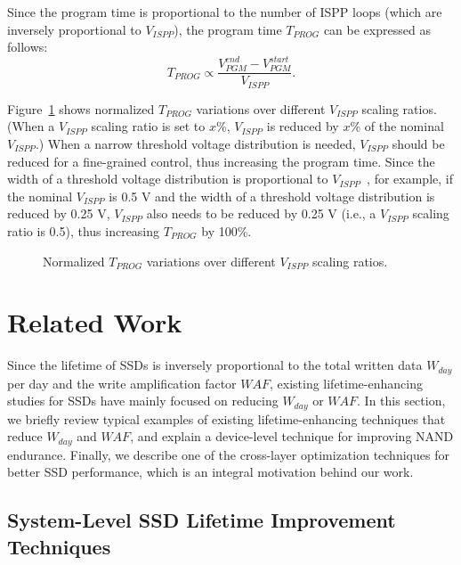 Since the program time is proportional to the number of ISPP loops (which are inversely proportional to $V_{ISPP}$), the program time $T_{PROG}$ can be expressed as follows:
\begin{equation}\label{eq:Background_Tpgm}
T_{PROG} \propto \frac{V_{PGM}^{end} - V_{PGM}^{start}}{V_{ISPP}}.
\end{equation}


Figure~\ref{fig:Background_TprogVispp} shows normalized $T_{PROG}$ variations over different $V_{ISPP}$ scaling ratios. (When a $V_{ISPP}$ scaling ratio is set to $x$\%, $V_{ISPP}$ is reduced by $x$\% of the nominal $V_{ISPP}$.)
When a narrow threshold voltage distribution is needed, $V_{ISPP}$ should be reduced for a fine-grained control, thus increasing the program time.
Since the width of a threshold voltage distribution is proportional to $V_{ISPP}$~\cite{ISPP_suh}, for example, if the nominal $V_{ISPP}$ is 0.5 V and the width of a threshold voltage distribution is reduced by 0.25 V, $V_{ISPP}$ also needs to be reduced by 0.25 V (i.e., a $V_{ISPP}$ scaling ratio is 0.5), thus increasing  $T_{PROG}$ by 100\%.


\begin{figure}[!t]
\centering
\caption{Normalized $T_{PROG}$ variations over different $V_{ISPP}$ scaling ratios.}
\label{fig:Background_TprogVispp}
\end{figure}


\section{Related Work}
\label{sec:Background_RelatedWork}


Since the lifetime of SSDs is inversely proportional to the total written data $W_{day}$ per day and the write amplification factor $WAF$, existing lifetime-enhancing studies for SSDs have mainly focused on reducing $W_{day}$ or $WAF$.
In this section, we briefly review typical examples of existing lifetime-enhancing techniques that reduce $W_{day}$ and $WAF$, and explain a device-level technique for improving NAND endurance.
Finally, we describe one of the cross-layer optimization techniques for better SSD performance, which is an integral motivation behind our work.


\subsection{System-Level SSD Lifetime Improvement Techniques}
\label{subsec:Background_ExistingLifetimeEnhancingTechniques}


